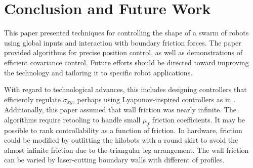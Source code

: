 \section{Conclusion and Future Work}\label{sec:conclusion}


This paper presented techniques for controlling the shape of a swarm of robots using global inputs and interaction with boundary friction forces.  
The paper provided algorithms for precise position control, as well as demonstrations of efficient covariance control. Future efforts should be directed toward improving the technology and tailoring it to specific robot applications.

  With regard to technological advances, this includes designing controllers that efficiently regulate $\sigma_{xy}$, perhaps using Lyapunov-inspired controllers as in \citet{Becker2013a,becker2014simultaneously}.
 Additionally, this paper assumed that wall friction was nearly infinite.  The algorithms require retooling to handle small $\mu_f$ friction coefficients.  It may be possible to rank controllability as a function of friction.
  In hardware, friction could be modified by outfitting the kilobots with a round skirt to avoid the almost infinite friction due to the triangular leg arrangement.  The wall friction can be varied by   laser-cutting boundary walls with different of profiles. 
  
    



%    
%    
    
